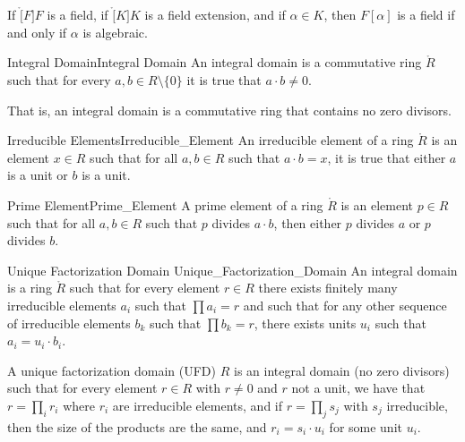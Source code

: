 \documentclass{article}                                                        %
\begin{document}
        \begin{theorem}
            If $\ring[F]{F}$ is a field, if $\ring[K]{K}$ is a field extension,
            and if $\alpha\in{K}$, then $F[\alpha]$ is a field if and only if
            $\alpha$ is algebraic. 
        \end{theorem}
        \begin{fdefinition}{Integral Domain}{Integral Domain}
            An integral domain is a commutative ring $\ring{R}$ such that for
            every $a,b\in{R}\setminus\{0\}$ it is true that $a\cdot{b}\ne{0}$.
        \end{fdefinition}
        That is, an integral domain is a commutative ring that contains no zero
        divisors.
        \begin{fdefinition}{Irreducible Elements}{Irreducible_Element}
            An irreducible element of a ring $\ring{R}$ is an element
            $x\in{R}$ such that for all $a,b\in{R}$ such that $a\cdot{b}=x$, it
            is true that either $a$ is a unit or $b$ is a unit.
        \end{fdefinition}
        \begin{fdefinition}{Prime Element}{Prime_Element}
            A prime element of a ring $\ring{R}$ is an element $p\in{R}$
            such that for all $a,b\in{R}$ such that $p$ divides $a\cdot{b}$,
            then either $p$ divides $a$ or $p$ divides $b$.
        \end{fdefinition}
        \begin{fdefinition}{Unique Factorization Domain}
                           {Unique_Factorization_Domain}
            An integral domain is a ring $\ring{R}$ such that for every
            element $r\in{R}$ there exists finitely many irreducible elements
            $a_{i}$ such that $\prod{a}_{i}=r$ and such that for any other
            sequence of irreducible elements $b_{k}$ such that $\prod{b}_{k}=r$,
            there exists units $u_{i}$ such that $a_{i}=u_{i}\cdot{b}_{i}$.
        \end{fdefinition}
        \begin{definition}
            A unique factorization domain (UFD) $R$ is an integral domain
            (no zero divisors) such that for every element $r\in{R}$ with
            $r\ne{0}$ and $r$ not a unit, we have that $r=\prod_{i}r_{i}$ where
            $r_{i}$ are irreducible elements, and if $r=\prod_{j}s_{j}$ with
            $s_{j}$ irreducible, then the size of the products are the same, and
            $r_{i}=s_{i}\cdot{u}_{i}$ for some unit $u_{i}$.
        \end{definition}
\end{document}
